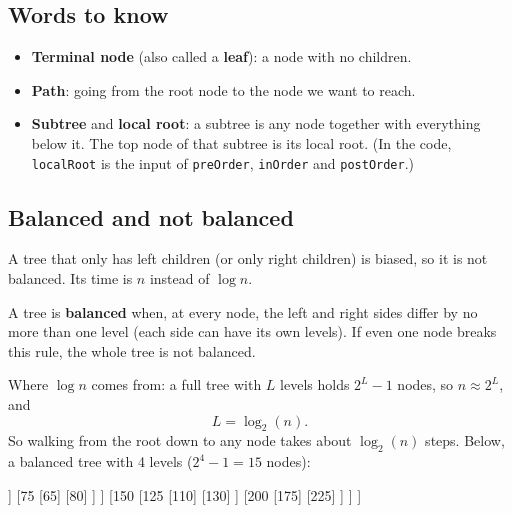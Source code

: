 \documentclass[11pt]{article}
\begin{document}
	\subsection*{Words to know}
	\begin{itemize}
		\item \textbf{Terminal node} (also called a \textbf{leaf}): a node with no children.
		\item \textbf{Path}: going from the root node to the node we want to reach.
		\item \textbf{Subtree} and \textbf{local root}: a subtree is any node together with everything below it. The top node of that subtree is its local root. (In the code, \texttt{localRoot} is the input of \texttt{preOrder}, \texttt{inOrder} and \texttt{postOrder}.)
	\end{itemize}
	
	\subsection*{Balanced and not balanced}
	A tree that only has left children (or only right children) is biased, so it is not balanced. Its time is $n$ instead of $\log n$.
	
	A tree is \textbf{balanced} when, at every node, the left and right sides differ by no more than one level (each side can have its own levels). If even one node breaks this rule, the whole tree is not balanced.
	
	Where $\log n$ comes from: a full tree with $L$ levels holds $2^L-1$ nodes, so $n \approx 2^L$, and
	\[ L = \log_2(n). \]
	So walking from the root down to any node takes about $\log_2(n)$ steps. Below, a balanced tree with 4 levels ($2^4-1 = 15$ nodes):
	
	\begin{center}
		\begin{forest}
			[100
			[50
			[25
			[10]
			[40]
			]
			[75
			[65]
			[80]
			]
			]
			[150
			[125
			[110]
			[130]
			]
			[200
			[175]
			[225]
			]
			]
			]
		\end{forest}
	\end{center}
	
\end{document}
